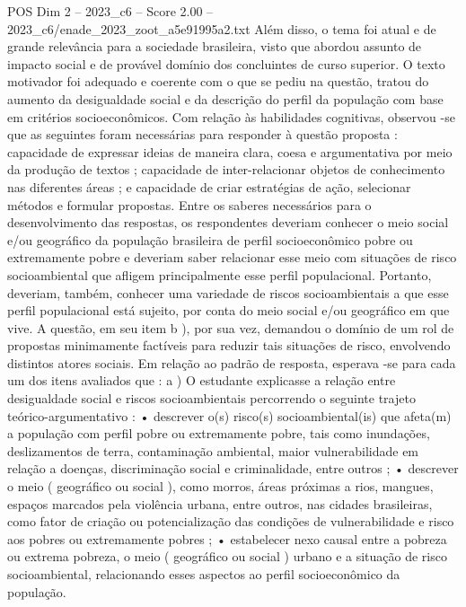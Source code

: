 \begin{textsample}{POS Dim 2 – 2023\_c6 – Score 2.00 – 2023\_c6/enade\_2023\_zoot\_a5e91995a2.txt}
Além disso, o tema foi atual e de grande relevância para a sociedade brasileira, visto que abordou assunto de impacto social e de provável domínio dos concluintes de curso superior.
O texto motivador foi adequado e coerente com o que se pediu na questão, tratou do aumento da desigualdade social e da descrição do perfil da população com base em critérios socioeconômicos.
Com relação às habilidades cognitivas, observou -se que as seguintes foram necessárias para responder à questão proposta : capacidade de expressar ideias de maneira clara, coesa e argumentativa por meio da produção de textos ; capacidade de inter-relacionar objetos de conhecimento nas diferentes áreas ; e capacidade de criar estratégias de ação, selecionar métodos e formular propostas.
Entre os saberes necessários para o desenvolvimento das respostas, os respondentes deveriam conhecer o meio social e/ou geográfico da população brasileira de perfil socioeconômico pobre ou extremamente pobre e deveriam saber relacionar esse meio com situações de risco socioambiental que afligem principalmente esse perfil populacional.
Portanto, deveriam, também, conhecer uma variedade de riscos socioambientais a que esse perfil populacional está sujeito, por conta do meio social e/ou geográfico em que vive.
A questão, em seu item b ), por sua vez, demandou o domínio de um rol de propostas minimamente factíveis para reduzir tais situações de risco, envolvendo distintos atores sociais.
Em relação ao padrão de resposta, esperava -se para cada um dos itens avaliados que : a ) O estudante explicasse a relação entre desigualdade social e riscos socioambientais percorrendo o seguinte trajeto teórico-argumentativo : • descrever o(s) risco(s) socioambiental(is) que afeta(m) a população com perfil pobre ou extremamente pobre, tais como inundações, deslizamentos de terra, contaminação ambiental, maior vulnerabilidade em relação a doenças, discriminação social e criminalidade, entre outros ; • descrever o meio ( geográfico ou social ), como morros, áreas próximas a rios, mangues, espaços marcados pela violência urbana, entre outros, nas cidades brasileiras, como fator de criação ou potencialização das condições de vulnerabilidade e risco aos pobres ou extremamente pobres ; • estabelecer nexo causal entre a pobreza ou extrema pobreza, o meio ( geográfico ou social ) urbano e a situação de risco socioambiental, relacionando esses aspectos ao perfil socioeconômico da população.

\end{textsample}
